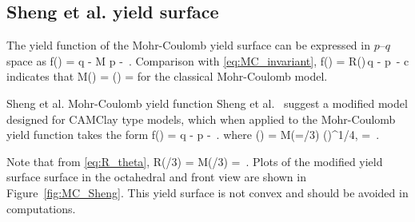 \subsection{Sheng et al. yield surface}
The yield function of the Mohr-Coulomb yield surface can be expressed in $p$--$q$ space as
\Beq \label{eq:Sheng}
  f(\Bsig) = q - M p -  \,.
\Eeq
Comparison with \eqref{eq:MC_invariant},
\Beq 
  f(\Bsig) = R(\theta)\,q - p~\sin\phi - c\cos\phi  
\Eeq
indicates that
\Beq 
  M(\theta) =  \quad \Tand \quad {}(\theta) = 
\Eeq
for the classical Mohr-Coulomb model. 
\begin{SummaryBox}[label=box:MC_sheng]{Sheng et al. Mohr-Coulomb yield function}
Sheng et al.~\cite{Sheng2000} suggest a modified model designed for CAMClay type models, which when applied
to the Mohr-Coulomb yield function takes the form
\Beq \label{eq:Sheng_mod}
  f(\Bsig) = q -  p -  \,.
\Eeq
where
\Beq
  (\theta) = M(\theta=\pi/3) \left(\right)^{1/4},
  \quad \Tand\quad
  \alpha =  \,.
\Eeq
\end{SummaryBox}
Note that from \eqref{eq:R_theta},
\Beq
  R(\pi/3) =  \quad \implies \quad
  M(\pi/3) = \,.
\Eeq
Plots of the modified yield surface surface in the octahedral and front view are shown in Figure~\ref{fig:MC_Sheng}.
This yield surface is not convex and should be avoided in computations.
